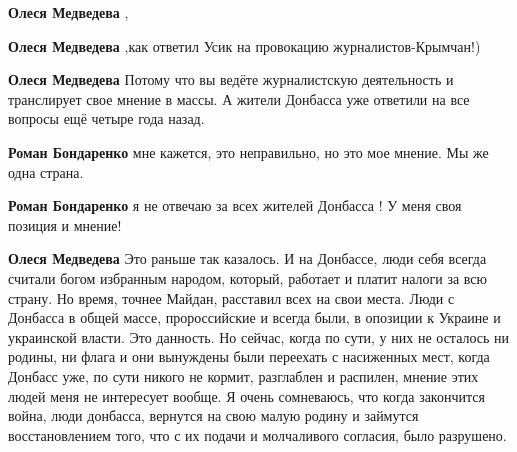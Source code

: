 \begin{itemize}
\begin{itemize}
 
\textbf{Олеся Медведева} ,

 
\textbf{Олеся Медведева} ,как ответил Усик на провокацию журналистов-Крымчан!)

 
\textbf{Олеся Медведева} Потому что вы ведёте журналистскую деятельность и
транслирует свое мнение в массы. А жители Донбасса уже ответили на все вопросы
ещё четыре года назад.

 
\textbf{Роман Бондаренко} мне кажется, это неправильно, но это мое мнение. Мы же одна страна.

 
\textbf{Роман Бондаренко} я не отвечаю за всех жителей Донбасса ! У меня своя позиция и мнение!

 
\textbf{Олеся Медведева} Это раньше так казалось. И на Донбассе, люди себя
всегда считали богом избранным народом, который, работает и платит налоги за
всю страну. Но время, точнее Майдан, расставил всех на свои места. Люди с
Донбасса в общей массе, пророссийские и всегда были, в опозиции к Украине и
украинской власти. Это данность. Но сейчас, когда по сути, у них не осталось ни
родины, ни флага и они вынуждены были переехать с насиженных мест, когда
Донбасс уже, по сути никого не кормит, разглаблен и распилен, мнение этих людей
меня не интересует вообще. Я очень сомневаюсь, что когда закончится война, люди
донбасса, вернутся на свою малую родину и займутся восстановлением того, что с
их подачи и молчаливого согласия, было разрушено.


\end{itemize}
\end{itemize}
